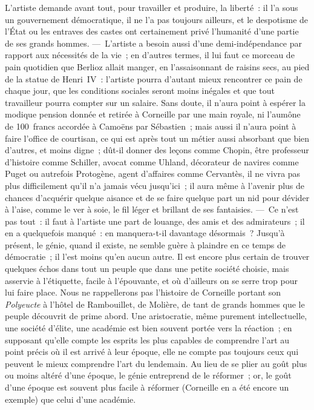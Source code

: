 \documentclass[french,twoside]{book} %
\begin{document}
L’artiste demande avant tout, pour travailler et produire, la liberté : il l’a sous un gouvernement démocratique, il ne l’a pas toujours ailleurs, et le despotisme de l’État ou les entraves des castes ont certainement privé l’humanité d’une partie de ses grands hommes. — L’artiste a besoin aussi d’une demi-indépendance par rapport aux nécessités de la vie ; en d’autres termes, il lui faut ce morceau de pain quotidien que Berlioz allait manger, en l’assaisonnant de raisins secs, au pied de la statue de Henri IV : l’artiste pourra d’autant mieux rencontrer ce pain de chaque jour, que les conditions sociales seront moins inégales et que tout travailleur pourra compter sur un salaire. Sans doute, il n’aura point à espérer la modique pension donnée et retirée à Corneille par une main royale, ni l’aumône de 100 francs accordée à Camoëns par Sébastien ; mais aussi il n’aura point à faire l’office de courtisan, ce  qui est après tout un métier aussi absorbant que bien d’autres, et moins digne ; dût-il donner des leçons comme Chopin, être professeur d’histoire comme Schiller, avocat comme Uhland, décorateur de navires comme Puget ou autrefois Protogène, agent d’affaires comme Cervantès, il ne vivra pas plus difficilement qu’il n’a jamais vécu jusqu’ici ; il aura même à l’avenir plus de chances d’acquérir quelque aisance et de se faire quelque part un nid pour dévider à l’aise, comme le ver à soie, le fil léger et brillant de ses fantaisies. — Ce n’est pas tout : il faut à l’artiste une part de louange, des amis et des admirateurs ; il en a quelquefois manqué : en manquera-t-il davantage désormais ? Jusqu’à présent, le génie, quand il existe, ne semble guère à plaindre en ce temps de démocratie ; il l’est moins qu’en aucun autre. Il est encore plus certain de trouver quelques échos dans tout un peuple que dans une petite société choisie, mais asservie à l’étiquette, facile à l’épouvante, et où d’ailleurs on se serre trop pour lui faire place. Nous ne rappellerons pas l’histoire de Corneille portant son \emph{Polyeucte} à l’hôtel de Rambouillet, de Molière, de tant de grands hommes que le peuple découvrit de prime abord. Une aristocratie, même purement intellectuelle, une société d’élite, une académie est bien souvent portée vers la réaction ; en supposant qu’elle compte les esprits les plus capables de comprendre l’art au point précis où il est arrivé à leur époque, elle ne compte pas toujours ceux qui peuvent le mieux comprendre l’art du lendemain. Au lieu de se plier au goût plus ou moins altéré d’une époque, le génie entreprend de le réformer ; or, le goût d’une époque est  souvent plus facile à réformer (Corneille en a été encore un exemple) que celui d’une académie.\par
\end{document}
